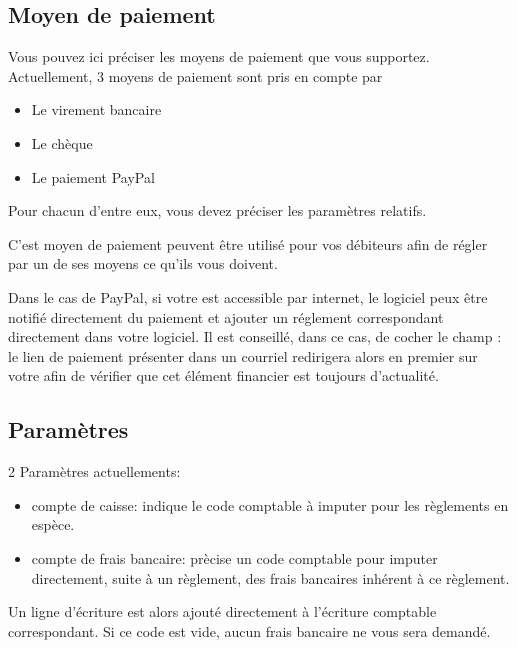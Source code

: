 \documentclass[a4paper,10pt,oneside,french]{sphinxmanual}
\begin{document}
\subsection{Moyen de paiement}
\label{\detokenize{payoff/config:moyen-de-paiement}}
Vous pouvez ici préciser les moyens de paiement que vous supportez.
Actuellement, 3 moyens de paiement sont pris en compte par 
\begin{itemize}
\item {} 
Le virement bancaire

\item {} 
Le chèque

\item {} 
Le paiement PayPal

\end{itemize}

Pour chacun d’entre eux, vous devez préciser les paramètres relatifs.

C’est moyen de paiement peuvent être utilisé pour vos débiteurs afin de régler par un de ses moyens ce qu’ils vous doivent.

Dans le cas de PayPal, si votre  est accessible par internet, le logiciel peux être notifié directement du paiement et ajouter un réglement correspondant directement dans votre logiciel.
Il est conseillé, dans ce cas, de cocher le champ : le lien de paiement présenter dans un courriel redirigera alors en premier sur votre  afin de vérifier que cet élément financier est toujours d’actualité.


\subsection{Paramètres}
\label{\detokenize{payoff/config:parametres}}
2 Paramètres actuellements:
\begin{itemize}
\item {} 
compte de caisse: indique le code comptable à imputer pour les règlements en espèce.

\item {} 
compte de frais bancaire: prècise un code comptable pour imputer directement, suite à un règlement, des frais bancaires inhérent à ce règlement.

\end{itemize}

Un ligne d’écriture est alors ajouté directement à l’écriture comptable correspondant.
Si ce code est vide, aucun frais bancaire ne vous sera demandé.
\end{document}
